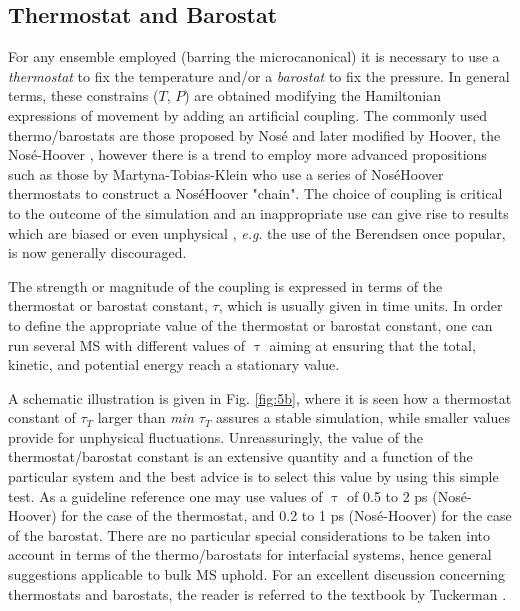 \documentclass[9pt,bestpractices]{livecoms}
\begin{document}
\subsection{Thermostat and Barostat}
\label{sec:thermostat}
For any ensemble employed (barring the microcanonical) it is necessary to use
a \textit{thermostat} to fix the temperature and/or a \textit{barostat} to fix
the pressure. In general terms, these constrains ($T$, $P$) are
obtained modifying the Hamiltonian expressions of movement by adding an
artificial coupling. The commonly used thermo/barostats are those proposed by
Nos\'{e} and later modified by Hoover, the Nos\'{e}-Hoover \citep{hoover1985},
however there is a trend to employ more advanced propositions such as
those by Martyna-Tobias-Klein \citep{martyna1992} who use a series of
Nos\'{e}\textendash{}Hoover thermostats to construct
a Nos\'{e}\textendash{}Hoover "chain".  The choice of coupling is critical to
the outcome of the simulation \citep{shirts2013}
and an inappropriate use can give rise to results which are biased
or even unphysical \citep{wong2016}, \textit{e.g}. the use of
the Berendsen \citep{berendsen1984}
once popular, is now generally discouraged.

The strength or magnitude of the coupling is expressed in terms of the
thermostat or barostat constant, {${\tau}$}, which is usually given in time
units. In order to define the appropriate value of the thermostat or barostat
constant, one can run several MS with different values of {${\uptau}$} aiming
at ensuring that the total, kinetic, and potential energy reach a stationary
value.

A schematic illustration is given in Fig. \ref{fig:5b}, where it is seen how a thermostat
constant of ${\tau}_{T}$ larger than \textit{min ${\tau}$}$_{T}$ assures
a stable simulation, while smaller values provide for unphysical fluctuations.
Unreassuringly, the value of the thermostat/barostat constant is an extensive quantity and a function of
the particular system and the best advice is to select this value by using this
simple test. As a guideline reference one may use values of {${\uptau}$} of 0.5 to 2 ps
(Nos\'{e}-Hoover) for the case of the thermostat, and 0.2 to 1 ps (Nos\'{e}-Hoover) for the case of the barostat. There are no particular special
considerations to be taken into account in terms of the thermo/barostats for
interfacial systems, hence general suggestions applicable to bulk MS uphold. For an excellent
discussion concerning thermostats and barostats, the reader is referred to the
textbook by Tuckerman \citep{tuckerman2010}.
\end{document}
